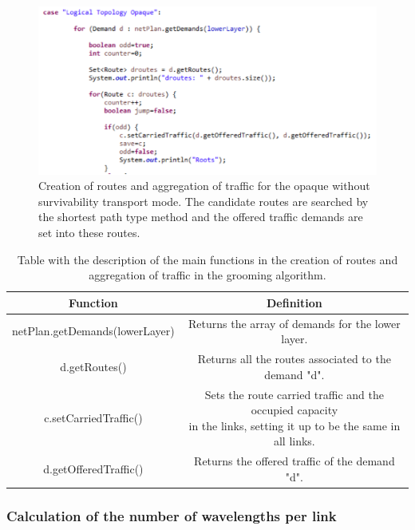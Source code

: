 \begin{figure}[H]
\centering
\includegraphics[width=14cm]{sdf/heuristic/opaque_survivability/figures/grooming_opaque_surv1}
\caption{Creation of routes and aggregation of traffic for the opaque without survivability transport mode. The candidate routes are searched by the shortest path type method and the offered traffic demands are set into these routes.}
\label{grooming_opaque_surv1}
\end{figure}

\begin{table}[H]
\centering
\begin{tabular}{|| c | c ||}
 \hline
 Function & Definition \\
 \hline\hline
 netPlan.getDemands(lowerLayer) & Returns the array of demands for the lower layer. \\
 \hline
 d.getRoutes() & Returns all the routes associated to the demand "d". \\
 \hline
 c.setCarriedTraffic() & \makecell{Sets the route carried traffic and the occupied capacity\\in the links, setting it up to be the same in all links.} \\
 \hline
 d.getOfferedTraffic() & Returns the offered traffic of the demand "d". \\
 \hline
\end{tabular}
\caption{Table with the description of the main functions in the creation of routes and aggregation of traffic in the grooming algorithm.}
\label{grooming_table_variables_opaque_surv}
\end{table}

\subsubsection{Calculation of the number of wavelengths per link}


